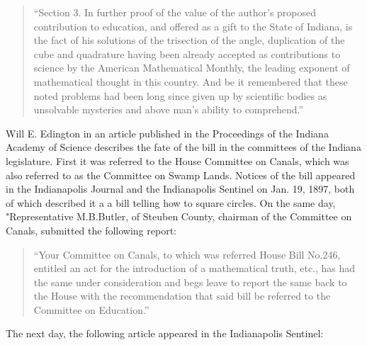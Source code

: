 \begin{quote}
``Section 3. In further proof of the value of the author's proposed
contribution to education, and offered as a gift to the State of Indiana,
is the fact of his solutions of the trisection of the angle, duplication of
the cube and quadrature having been already accepted as contributions to
science  by the American Mathematical Monthly, the leading exponent of
mathematical thought in this country. And be it remembered that these
noted problems had been long since given up by scientific bodies as
unsolvable mysteries and above man's ability to comprehend.''
\end{quote}

Will E. Edington in an article published in the Proceedings of the
Indiana Academy of Science
 describes the fate of the bill in the committees of the Indiana
legislature. First it was referred to the House Committee on Canals, which was
also referred to as the Committee on Swamp Lands. Notices of the bill appeared
in the Indianapolis Journal and the Indianapolis Sentinel on Jan. 19, 1897,
both of which described it a a bill telling how to square circles. On the same
day, "Representative M.B.Butler, of Steuben County, chairman of the
Committee on Canals, submitted the following report:

\begin{quote}
``Your Committee on Canals, to which was referred House Bill No.246, entitled
an act for the introduction of a mathematical truth, etc., has had the same
under consideration and begs leave to report the same back to the House with
the recommendation that said bill be referred to the Committee on Education.''
\end{quote}

\noindent The next day, the following article appeared in the Indianapolis Sentinel:


